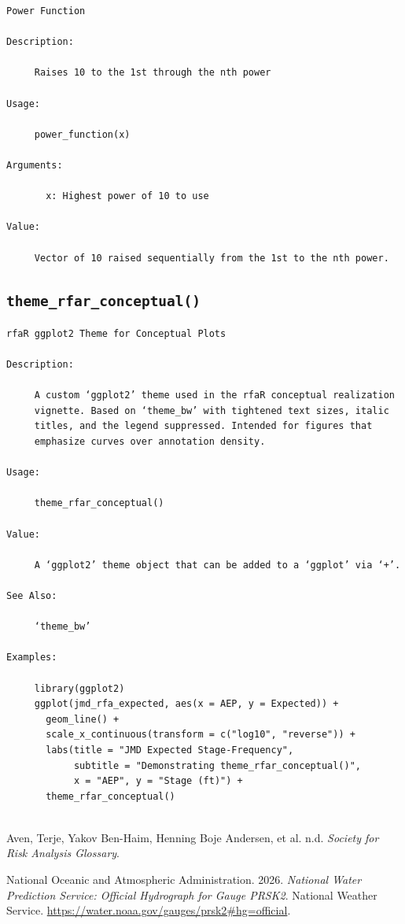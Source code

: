 \documentclass[
  letterpaper,
  DIV=11,
  numbers=noendperiod]{scrreprt}
\newlength{\cslhangindent}
\newenvironment{CSLReferences}[2] %
 {\begin{list}{}{%
  \setlength{\itemindent}{0pt}
  \setlength{\leftmargin}{0pt}
  \setlength{\parsep}{0pt}
  \ifodd #1
   \setlength{\leftmargin}{\cslhangindent}
   \setlength{\itemindent}{-1\cslhangindent}
  \fi
  \setlength{\itemsep}{#2\baselineskip}}}
 {\end{list}}
\begin{document}
\begin{verbatim}
Power Function

Description:

     Raises 10 to the 1st through the nth power

Usage:

     power_function(x)
     
Arguments:

       x: Highest power of 10 to use

Value:

     Vector of 10 raised sequentially from the 1st to the nth power.
\end{verbatim}

\subsection{\texorpdfstring{\texttt{theme\_rfar\_conceptual()}}{theme\_rfar\_conceptual()}}\label{theme_rfar_conceptual}

\begin{verbatim}
rfaR ggplot2 Theme for Conceptual Plots

Description:

     A custom ‘ggplot2’ theme used in the rfaR conceptual realization
     vignette. Based on ‘theme_bw’ with tightened text sizes, italic
     titles, and the legend suppressed. Intended for figures that
     emphasize curves over annotation density.

Usage:

     theme_rfar_conceptual()
     
Value:

     A ‘ggplot2’ theme object that can be added to a ‘ggplot’ via ‘+’.

See Also:

     ‘theme_bw’

Examples:

     library(ggplot2)
     ggplot(jmd_rfa_expected, aes(x = AEP, y = Expected)) +
       geom_line() +
       scale_x_continuous(transform = c("log10", "reverse")) +
       labs(title = "JMD Expected Stage-Frequency",
            subtitle = "Demonstrating theme_rfar_conceptual()",
            x = "AEP", y = "Stage (ft)") +
       theme_rfar_conceptual()
     
\end{verbatim}

\protect{}\label{refs}
\begin{CSLReferences}{1}{1}
Aven, Terje, Yakov Ben-Haim, Henning Boje Andersen, et al. n.d.
\emph{Society for {Risk} {Analysis} {Glossary}}.

National Oceanic and Atmospheric Administration. 2026. \emph{National
Water Prediction Service: Official Hydrograph for Gauge PRSK2}. National
Weather Service. \url{https://water.noaa.gov/gauges/prsk2\#hg=official}.

\end{CSLReferences}
\end{document}
